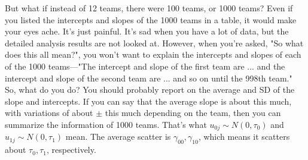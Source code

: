 \documentclass{ltjsbook}
\begin{document}
But what if instead of 12 teams, there were 100 teams, or 1000 teams? Even if you listed the intercepts and slopes of the 1000 teams in a table, it would make your eyes ache. It's just painful. It's sad when you have a lot of data, but the detailed analysis results are not looked at. However, when you're asked, "So what does this all mean?", you won't want to explain the intercepts and slopes of each of the 1000 teams—"The intercept and slope of the first team are ... and the intercept and slope of the second team are ... and so on until the 998th team." So, what do you do?
You should probably report on the average and SD of the slope and intercepts. If you can say that the average slope is about this much, with variations of about $\pm$ this much depending on the team, then you can summarize the information of 1000 teams.
That's what $u_{0j} \sim N(0,\tau_{0})$ and $u_{1j} \sim N(0,\tau_{1})$ mean. The average scatter is $\gamma_{00},\gamma_{10}$, which means it scatters about $\tau_0,\tau_1$, respectively.
\end{document}

